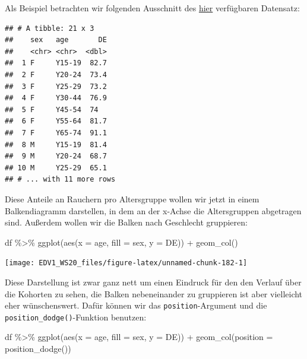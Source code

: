 \documentclass[
]{book}
\newenvironment{Shaded}{\begin{snugshade}}{\end{snugshade}}
\newcommand{\AttributeTok}[1]{\textcolor[rgb]{0.77,0.63,0.00}{#1}}
\newcommand{\FunctionTok}[1]{\textcolor[rgb]{0.00,0.00,0.00}{#1}}
\newcommand{\NormalTok}[1]{#1}
\newcommand{\SpecialCharTok}[1]{\textcolor[rgb]{0.00,0.00,0.00}{#1}}
\begin{document}
Als Beispiel betrachten wir folgenden Ausschnitt des \href{https://data.europa.eu/euodp/de/data/dataset/VarZwbQ6Vy3cFkW2UbITzA}{hier} verfügbaren Datensatz:

\begin{verbatim}
## # A tibble: 21 x 3
##    sex   age       DE
##    <chr> <chr>  <dbl>
##  1 F     Y15-19  82.7
##  2 F     Y20-24  73.4
##  3 F     Y25-29  73.2
##  4 F     Y30-44  76.9
##  5 F     Y45-54  74  
##  6 F     Y55-64  81.7
##  7 F     Y65-74  91.1
##  8 M     Y15-19  81.4
##  9 M     Y20-24  68.7
## 10 M     Y25-29  65.1
## # ... with 11 more rows
\end{verbatim}

Diese Anteile an Rauchern pro Altersgruppe wollen wir jetzt in einem Balkendiagramm darstellen, in dem an der x-Achse die Altersgruppen abgetragen sind. Außerdem wollen wir die Balken nach Geschlecht gruppieren:

\begin{Shaded}
\begin{Highlighting}[]
\NormalTok{df }\SpecialCharTok{\%\textgreater{}\%} 
  \FunctionTok{ggplot}\NormalTok{(}\FunctionTok{aes}\NormalTok{(}\AttributeTok{x =}\NormalTok{ age, }\AttributeTok{fill =}\NormalTok{ sex, }\AttributeTok{y =}\NormalTok{ DE)) }\SpecialCharTok{+}
  \FunctionTok{geom\_col}\NormalTok{()}
\end{Highlighting}
\end{Shaded}

\begin{center}\texttt{[image: EDV1\_WS20\_files/figure-latex/unnamed-chunk-182-1]} \end{center}

Diese Darstellung ist zwar ganz nett um einen Eindruck für den den Verlauf über die Kohorten zu sehen, die Balken nebeneinander zu gruppieren ist aber vielleicht eher wünschenswert. Dafür können wir das \texttt{position}-Argument und die \texttt{position\_dodge()}-Funktion benutzen:

\begin{Shaded}
\begin{Highlighting}[]
\NormalTok{df }\SpecialCharTok{\%\textgreater{}\%} 
  \FunctionTok{ggplot}\NormalTok{(}\FunctionTok{aes}\NormalTok{(}\AttributeTok{x =}\NormalTok{ age, }\AttributeTok{fill =}\NormalTok{ sex, }\AttributeTok{y =}\NormalTok{ DE)) }\SpecialCharTok{+}
  \FunctionTok{geom\_col}\NormalTok{(}\AttributeTok{position =} \FunctionTok{position\_dodge}\NormalTok{())}
\end{Highlighting}
\end{Shaded}
\end{document}

